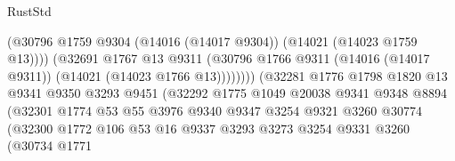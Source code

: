 \begin{lexlean}{RustStd}
\begin{coremodule}
                                            (@30796
                                              @1759
                                              @9304
                                              (@14016 (@14017 @9304))
                                              (@14021 (@14023 @1759 @13))))
                                          (@32691
                                            @1767
                                            @13
                                            @9311
                                            (@30796
                                              @1766
                                              @9311
                                              (@14016 (@14017 @9311))
                                              (@14021 (@14023 @1766 @13))))))))
                                  (@32281
                                    @1776
                                    @1798
                                    @1820
                                    @13
                                    @9341
                                    @9350
                                    @3293
                                    @9451
                                    (@32292
                                      @1775
                                      @1049
                                      @20038
                                      @9341
                                      @9348
                                      @8894
                                      (@32301
                                        @1774
                                        @53
                                        @55
                                        @3976
                                        @9340
                                        @9347
                                        @3254
                                        @9321
                                        @3260
                                        @30774
                                        (@32300
                                          @1772
                                          @106
                                          @53
                                          @16
                                          @9337
                                          @3293
                                          @3273
                                          @3254
                                          @9331
                                          @3260
                                          (@30734
                                            @1771

\end{coremodule}
\end{lexlean}
